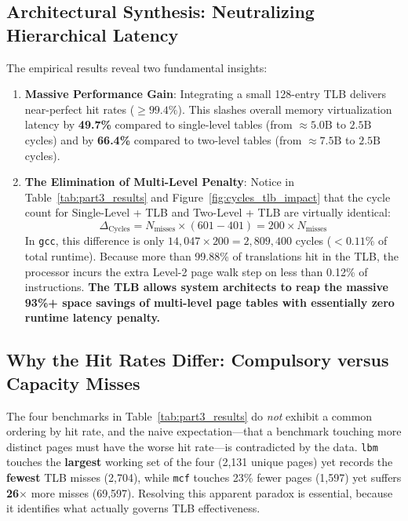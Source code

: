 \documentclass[11pt,a4paper]{article}
\begin{document}
\subsection{Architectural Synthesis: Neutralizing Hierarchical Latency}
The empirical results reveal two fundamental insights:
\begin{enumerate}
    \item \textbf{Massive Performance Gain}: Integrating a small 128-entry TLB delivers near-perfect hit rates ($\ge 99.4\%$). This slashes overall memory virtualization latency by \textbf{49.7\%} compared to single-level tables (from $\approx 5.0\text{B}$ to $2.5\text{B}$ cycles) and by \textbf{66.4\%} compared to two-level tables (from $\approx 7.5\text{B}$ to $2.5\text{B}$ cycles).
    \item \textbf{The Elimination of Multi-Level Penalty}: Notice in Table~\ref{tab:part3_results} and Figure~\ref{fig:cycles_tlb_impact} that the cycle count for Single-Level + TLB and Two-Level + TLB are virtually identical:
    \begin{equation}
        \Delta_{\text{Cycles}} = N_{\text{misses}} \times (601 - 401) = 200 \times N_{\text{misses}}
    \end{equation}
    In \texttt{gcc}, this difference is only $14,047 \times 200 = 2,809,400$ cycles ($< 0.11\%$ of total runtime). Because more than 99.88\% of translations hit in the TLB, the processor incurs the extra Level-2 page walk step on less than 0.12\% of instructions. \textbf{The TLB allows system architects to reap the massive 93\%+ space savings of multi-level page tables with essentially zero runtime latency penalty.}

\end{enumerate}

\subsection{Why the Hit Rates Differ: Compulsory versus Capacity Misses}
The four benchmarks in Table~\ref{tab:part3_results} do \emph{not} exhibit a common ordering by hit rate, and the naive expectation---that a benchmark touching more distinct pages must have the worse hit rate---is contradicted by the data. \texttt{lbm} touches the \textbf{largest} working set of the four (2,131 unique pages) yet records the \textbf{fewest} TLB misses (2,704), while \texttt{mcf} touches 23\% fewer pages (1,597) yet suffers \textbf{26$\times$} more misses (69,597). Resolving this apparent paradox is essential, because it identifies what actually governs TLB effectiveness.
\end{document}
